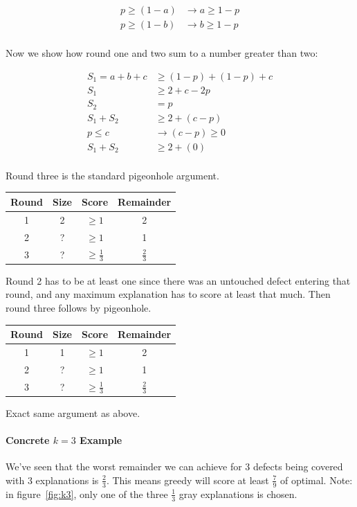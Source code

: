 \begin{eqnarray*}
p \geq (1-a) & \rightarrow a \geq 1-p \\
p \geq (1-b) &\rightarrow b \geq 1-p \\
\end{eqnarray*}

Now we show how round one and two sum to a number greater than two:

\begin{eqnarray*}
S_1 = a+b+c &\geq (1-p) + (1-p) + c \\
S_1 &\geq 2 + c - 2p \\
S_2 &= p \\
S_1 + S_2 &\geq 2 + (c - p) \\
p \leq c &\rightarrow (c-p) \geq 0 \\
S_1 + S_2 &\geq 2 + (0) \\
\end{eqnarray*}

Round three is the standard pigeonhole argument.

\begin{tabular}{cccc}\hline
Round & Size & Score & Remainder \\ \hline
1 & 2 & $\geq 1$ & 2 \\
2 & ? & $\geq 1$ & 1 \\
3 & ? & $\geq \frac13$ & $\frac23$ \\
\end{tabular}

Round 2 has to be at least one since there was an untouched defect entering that round, and any maximum explanation has to score at least that much.  Then round three follows by pigeonhole.

\begin{tabular}{cccc}\hline
Round & Size & Score & Remainder \\ \hline
1 & 1 & $\geq 1$ & 2 \\
2 & ? & $\geq 1$ & 1 \\
3 & ? & $\geq \frac13$ & $\frac23$ \\
\end{tabular}

Exact same argument as above.

\paragraph{Concrete $k=3$ Example}

We've seen that the worst remainder we can achieve for 3 defects being covered with 3 explanations is $\frac23$.  This means greedy will score at least $\frac79$ of optimal.  Note: in figure~\ref{fig:k3}, only one of the three $\frac13$ gray explanations is chosen.

